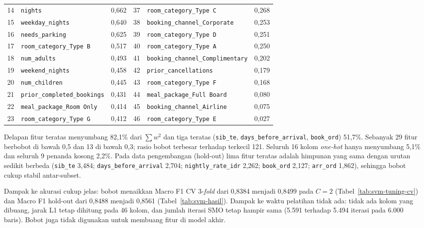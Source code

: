 \begin{table}[H]
\begin{tabularx}{\textwidth}{r Y r r Y r}
		14 & \texttt{nights} & 0,662 & 37 & \texttt{room\_\allowbreak category\_\allowbreak Type C} & 0,268 \\
		15 & \texttt{weekday\_\allowbreak nights} & 0,640 & 38 & \texttt{booking\_\allowbreak channel\_\allowbreak Corporate} & 0,253 \\
		16 & \texttt{needs\_\allowbreak parking} & 0,625 & 39 & \texttt{room\_\allowbreak category\_\allowbreak Type D} & 0,251 \\
		17 & \texttt{room\_\allowbreak category\_\allowbreak Type B} & 0,517 & 40 & \texttt{room\_\allowbreak category\_\allowbreak Type A} & 0,250 \\
		18 & \texttt{num\_\allowbreak adults} & 0,493 & 41 & \texttt{booking\_\allowbreak channel\_\allowbreak Complimentary} & 0,202 \\
		19 & \texttt{weekend\_\allowbreak nights} & 0,458 & 42 & \texttt{prior\_\allowbreak cancellations} & 0,179 \\
		20 & \texttt{num\_\allowbreak children} & 0,445 & 43 & \texttt{room\_\allowbreak category\_\allowbreak Type F} & 0,168 \\
		21 & \texttt{prior\_\allowbreak completed\_\allowbreak bookings} & 0,431 & 44 & \texttt{meal\_\allowbreak package\_\allowbreak Full Board} & 0,080 \\
		22 & \texttt{meal\_\allowbreak package\_\allowbreak Room Only} & 0,414 & 45 & \texttt{booking\_\allowbreak channel\_\allowbreak Airline} & 0,075 \\
		23 & \texttt{room\_\allowbreak category\_\allowbreak Type G} & 0,412 & 46 & \texttt{room\_\allowbreak category\_\allowbreak Type E} & 0,027 \\
		\bottomrule
	\end{tabularx}
\end{table}

Delapan fitur teratas menyumbang 82,1\% dari $\sum w^2$ dan tiga teratas (\texttt{sib\_te}, \texttt{days\_before\_arrival}, \texttt{book\_ord}) 51,7\%. Sebanyak 29 fitur berbobot di bawah 0,5 dan 13 di bawah 0,3; rasio bobot terbesar terhadap terkecil 121. Seluruh 16 kolom \textit{one-hot} hanya menyumbang 5,1\% dan seluruh 9 penanda kosong 2,2\%. Pada data pengembangan (hold-out) lima fitur teratas adalah himpunan yang sama dengan urutan sedikit berbeda (\texttt{sib\_te} 3,484; \texttt{days\_before\_arrival} 2,704; \texttt{nightly\_rate\_idr} 2,262; \texttt{book\_ord} 2,127; \texttt{arr\_ord} 1,862), sehingga bobot cukup stabil antar-subset.

Dampak ke akurasi cukup jelas: bobot menaikkan Macro F1 CV 3-\textit{fold} dari 0,8384 menjadi 0,8499 pada $C = 2$ (Tabel~\ref{tab:svm-tuning-cv}) dan Macro F1 hold-out dari 0,8488 menjadi 0,8561 (Tabel~\ref{tab:svm-hasil}). Dampak ke waktu pelatihan tidak ada: tidak ada kolom yang dibuang, jarak L1 tetap dihitung pada 46 kolom, dan jumlah iterasi SMO tetap hampir sama (5.591 terhadap 5.494 iterasi pada 6.000 baris). Bobot juga tidak digunakan untuk membuang fitur di model akhir.

